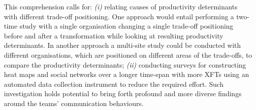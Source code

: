 This comprehension calls for: \emph{(i)} relating causes of productivity determinants with different trade-off positioning. One approach would entail performing a two-time study with a single organisation changing a single trade-off positioning before and after a transformation while looking at resulting productivity determinants. In another approach a multi-site study could be conducted with different organisations, which are positioned on different areas of the trade-offs, to compare the productivity determinants; \emph{(ii)} conducting surveys for constructing heat maps and social networks over a longer time-span with more \acp{XFT} using an automated data collection instrument to reduce the required effort. Such investigation holds potential to bring forth profound and more diverse findings around the teams' communication behaviours.